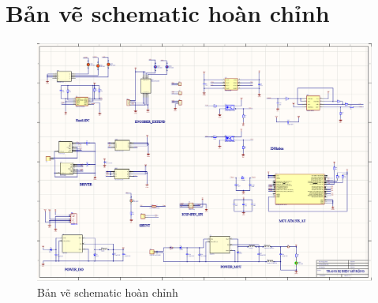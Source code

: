 \section{Bản vẽ schematic hoàn chỉnh}
\begin{figure}[H]
    \centering
    \includegraphics[width=1\textwidth]{pictures/ISO_current.png}
    \caption{Bản vẽ schematic hoàn chỉnh}
\end{figure}
\cleardoublepage
